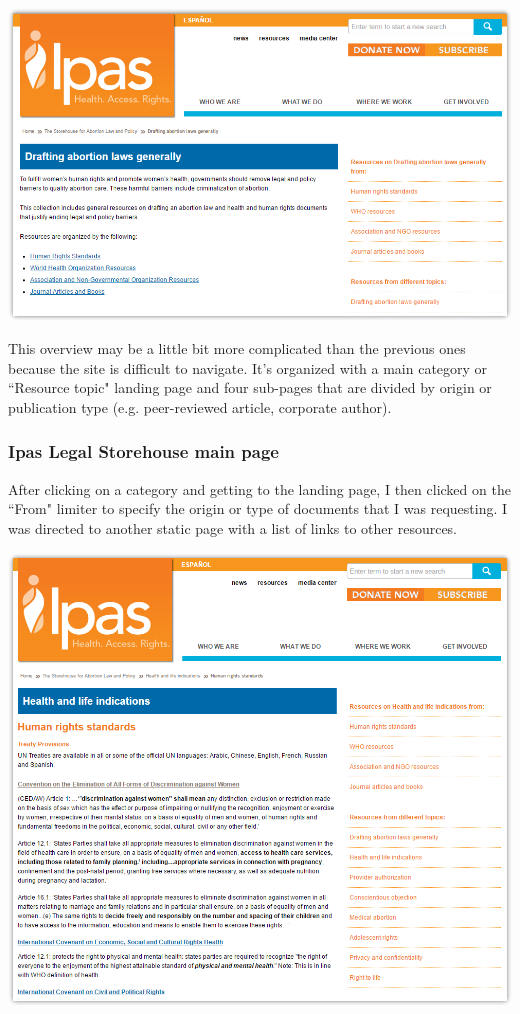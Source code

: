 \documentclass{article}
\begin{document}
\noindent\includegraphics[width=\textwidth]{2016-06-09-Ipas-landing}

\noindent This overview may be a little bit more complicated than the previous ones because the site is difficult to navigate. It's organized with a main category or ``Resource topic" landing page and four sub-pages that are divided by origin or publication type (e.g. peer-reviewed article, corporate author). 

\subsubsection{Ipas Legal Storehouse main page}
After clicking on a category and getting to the landing page, I then clicked on the ``From" limiter to specify the origin or type of documents that I was requesting. I was directed to another static page with a list of links to other resources.

\noindent\includegraphics[width=\textwidth]{2016-06-09-Ipas-category}
\end{document}
